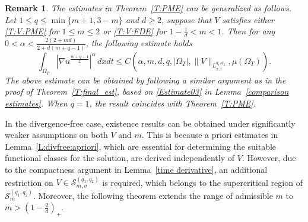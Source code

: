 \documentclass{amsart}
\newtheorem{remark}[defn]{Remark}
\numberwithin{equation}{section}
\begin{document}
\begin{remark} 
The estimates in Theorem~\ref{T:PME} can be generalized as follows.
	Let $1\leq q \le \min\{m+1, 3-m\}$ and $d\geq 2$, suppose that $V$ satisfies either \eqref{T:V:PME} for $1\leq m \leq 2$ or \eqref{T:V:FDE} for $1-\frac{1}{d}< m < 1$. Then for any
	$0 < \alpha < \frac{2(2+md)}{2+d(m+q-1)}$, the following estimate holds
    \begin{equation}\label{Estimate05}
\int_{\Omega_T} \left|\nabla u^{\frac{m+q-1}{2}}\right|^{\alpha} \,dxdt
\leq  C\left(\alpha, m, d, q,  |\Omega_T|, \|V\|_{L_{x,t}^{q_1,q_2}}, \mu(\Omega_{T})\right).
	\end{equation}	
The above estimate can be obtained by following a similar argument as in the proof of Theorem~\ref{T:final_est}, based on \eqref{Estimate03} in Lemma~\ref{comparison estimates}.  When $q=1$, the result coincides with Theorem~\ref{T:PME}.
\end{remark}







In the divergence-free case, existence results can be obtained under significantly weaker assumptions on both \(V\) and \(m\).
This is because a priori estimates in Lemma~\ref{L:divfree:apriori}, which are essential for determining the suitable functional classes for the solution, are derived independently of \(V\).
However, due to the compactness argument in Lemma~\ref{time derivative}, an additional restriction on $V \in \mathcal{S}_{m,\sigma}^{(q_1,q_2)}$ is required, which belongs to the supercritical region of \(\mathcal{S}_{m}^{(q_1,q_2)}\).
Moreover, the following theorem extends the range of admissible \(m\) to $m > (1 - \frac{2}{d})_{+}$.
\end{document}
